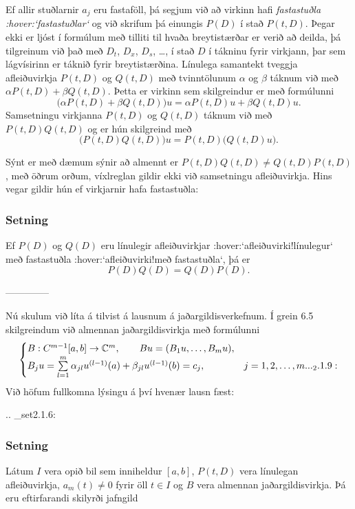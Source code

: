 Ef allir stuðlarnir $a_j$ eru fastaföll, þá
segjum við að virkinn hafi {\it fastastuðla :hover:`fastastuðlar`} og við
skrifum  þá einungis $P(D)$ í stað $P(t,D)$.  
Þegar ekki er ljóst í formúlum með tilliti til hvaða breytistærðar er
verið að deilda, þá tilgreinum  við það með 
$D_t$, $D_x$, $D_s$, \dots, í stað $D$
í tákninu fyrir virkjann, þar sem lágvísirinn er táknið fyrir
breytistærðina. 
Línulega samantekt tveggja
afleiðuvirkja $P(t,D)$ og $Q(t,D)$ með tvinntölunum $\alpha$ og
$\beta$ táknum við með $\alpha P(t,D)+\beta Q(t,D)$.  Þetta er
virkinn sem skilgreindur er með formúlunni
$$
\big(\alpha P(t,D) + \beta Q(t,D)\big)u=
\alpha P(t,D)u + \beta Q(t,D)u.
$$
Samsetningu virkjanna $P(t,D)$ og $Q(t,D)$ táknum við með
$P(t,D)Q(t,D)$ og er hún skilgreind með
$$
\big(P(t,D)Q(t,D)\big)u=
P(t,D)\big(Q(t,D)u\big).
$$


Sýnt er með dæmum sýnir að almennt
er $P(t,D)Q(t,D)\neq Q(t,D)P(t,D)$, með öðrum orðum, víxlreglan
gildir ekki við samsetningu afleiðuvirkja.
Hins vegar gildir hún ef virkjarnir hafa fastastuðla:

\subsubsection{Setning}
Ef $P(D)$ og $Q(D)$ eru línulegir
afleiðuvirkjar :hover:`afleiðuvirki!línulegur` með
fastastuðla :hover:`afleiðuvirki!með fastastuðla`,
þá er
 $$P(D)Q(D)=Q(D)P(D).
 $$


--------------





Nú skulum við líta á tilvist á lausnum á jaðargildisverkefnum.  Í grein
6.5 skilgreindum við almennan jaðargildisvirkja með formúlunni
\begin{equation*}
\begin{cases}
B:C^{m-1}[a,b]\to {\mathbb C}^m, \qquad Bu=(B_1u,\dots,B_mu),\\
B_ju=\sum\limits_{l=1}^m {\alpha}_{jl}u^{(l-1)}(a)
+{\beta}_{jl}u^{(l-1)}(b)=c_j,  &j=1,2,\dots,m.

.. _2.1.9:

\end{cases}
\end{equation*}
Við höfum fullkomna lýsingu á því hvenær lausn fæst:


.. _set2.1.6:

\subsubsection{Setning} Látum $I$ vera opið bil sem inniheldur $[a,b]$, $P(t,D)$ vera
línulegan afleiðuvirkja, $a_m(t)\neq 0$ fyrir
öll $t\in I$ og $B$ vera almennan jaðargildisvirkja.
Þá eru eftirfarandi skilyrði jafngild

